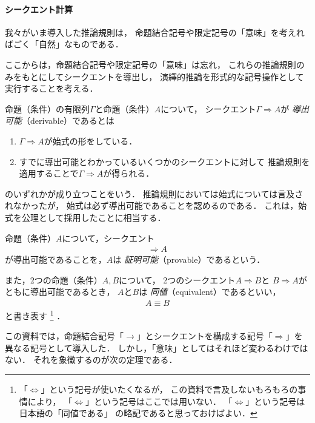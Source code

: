  \paragraph{シークエント計算}
 我々がいま導入した推論規則は，
 命題結合記号や限定記号の「意味」を考えればごく「自然」なものである．

 ここからは，命題結合記号や限定記号の「意味」は忘れ，
 これらの推論規則のみをもとにしてシークエントを導出し，
 演繹的推論を形式的な記号操作として実行することを考える．
 
 命題（条件）の有限列$\varGamma$と命題（条件）$A$について，
 シークエント$\varGamma \Longrightarrow A$が
 \emph{導出可能}（derivable）であるとは
 \begin{enumerate}
   \item $\varGamma \Longrightarrow A$が始式の形をしている．
   \item すでに導出可能とわかっているいくつかのシークエントに対して
         推論規則を適用することで$\varGamma \Longrightarrow A$が得られる．
 \end{enumerate}
 のいずれかが成り立つことをいう．
 推論規則においては始式については言及されなかったが，
 始式は必ず導出可能であることを認めるのである．
 これは，始式を公理として採用したことに相当する．

 命題（条件）$A$について，シークエント
 \begin{align*}
   \Longrightarrow A
 \end{align*}
 が導出可能であることを，$A$は
 \emph{証明可能}（provable）であるという．

 また，2つの命題（条件）$A,  B$について，
 2つのシークエント$A \Longrightarrow B$と
 $B \Longrightarrow A$がともに導出可能であるとき，
 $A$と$B$は
   \emph{同値}（equivalent）であるといい，
 \begin{align}
   A \equiv  B
 \end{align}
 と書き表す
 \footnote{「$\Longleftrightarrow$」という記号が使いたくなるが，
 この資料で言及しないもろもろの事情により，
 「$\Longleftrightarrow$」という記号はここでは用いない．
 「$\Longleftrightarrow$」という記号は日本語の「同値である」
 の略記であると思っておけばよい．
 }
 ．

 この資料では，命題結合記号「$\to$」とシークエントを構成する記号「$\Longrightarrow$」を
 異なる記号として導入した．
 しかし，「意味」としてはそれほど変わるわけではない．
 それを象徴するのが次の定理である．
 
